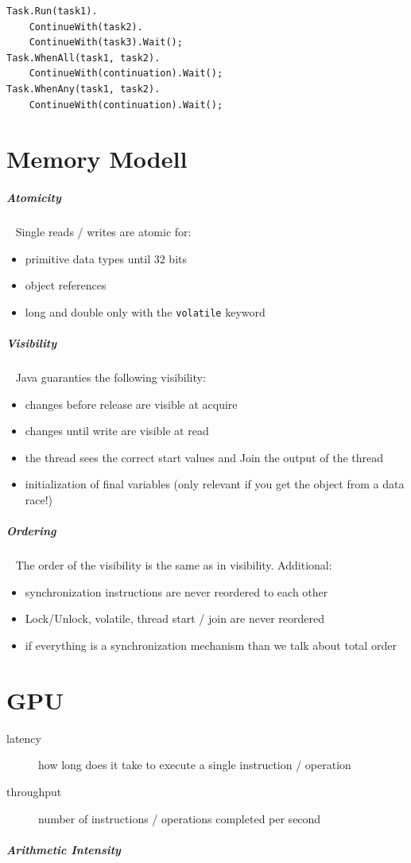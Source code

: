 \documentclass[11pt,twoside,landscape]{article}
\begin{document}
\begin{multicols}{3}
\lstset{language=csharp,label= ,caption= ,captionpos=b,numbers=none}
\begin{lstlisting}
Task.Run(task1).
    ContinueWith(task2).
    ContinueWith(task3).Wait();
Task.WhenAll(task1, task2).
    ContinueWith(continuation).Wait();
Task.WhenAny(task1, task2).
    ContinueWith(continuation).Wait();
\end{lstlisting}
\section{Memory Modell}
\label{sec:org6fb918f}
\subparagraph{Atomicity} \
\label{sec:orgbaa57b0}
Single reads / writes are atomic for:
\begin{itemize}
\item primitive data types until 32 bits
\item object references
\item long and double only with the \texttt{volatile} keyword
\end{itemize}
\subparagraph{Visibility} \
\label{sec:org5aba735}
Java guaranties the following visibility:
\begin{itemize}
\item changes before release are visible at acquire
\item changes until write are visible at read
\item the thread sees the correct start values and Join the output of the thread
\item initialization of final variables (only relevant if you get the object from a data race!)
\end{itemize}

\subparagraph{Ordering} \
\label{sec:org8cf4630}
The order of the visibility is the same as in visibility.
Additional:
\begin{itemize}
\item synchronization instructions are never reordered to each other
\item Lock/Unlock, volatile, thread start / join are never reordered
\item if everything is a synchronization mechanism than we talk about total order
\end{itemize}

\section{GPU}
\label{sec:org57a7419}
\begin{description}
\item[{latency}] how long does it take to execute a single instruction / operation
\item[{throughput}] number of instructions / operations completed per second
\end{description}
\subparagraph{Arithmetic Intensity} \
\label{sec:org15c74ee}


\end{multicols}
\end{document}
